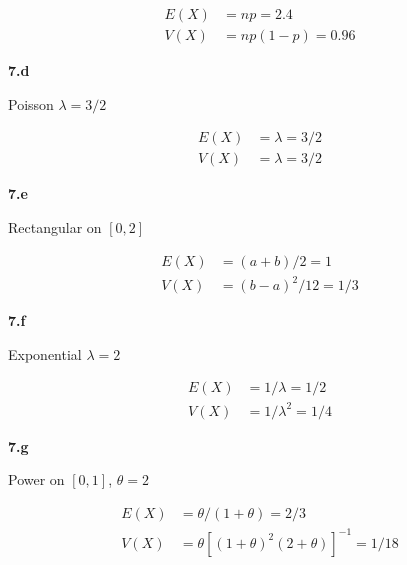 \documentclass{article}
\newcommand{\1}{\mathbf{1}}
\begin{document}
\begin{align*}
E(X) &= np = 2.4 \\
V(X) &= np(1-p) = 0.96
\end{align*}

\vspace{\baselineskip}
\noindent \textbf{\large 7.d}

Poisson $\lambda=3/2$

\begin{align*}
E(X) &= \lambda = 3/2 \\
V(X) &= \lambda = 3/2
\end{align*}

\vspace{\baselineskip}
\noindent \textbf{\large 7.e}

Rectangular on $[0,2]$

\begin{align*}
E(X) &= (a+b)/2 = 1 \\
V(X) &= (b-a)^2/12 = 1/3
\end{align*}

\vspace{\baselineskip}
\noindent \textbf{\large 7.f}

Exponential $\lambda=2$

\begin{align*}
E(X) &= 1/\lambda = 1/2 \\
V(X) &= 1/\lambda^2 = 1/4
\end{align*}

\vspace{\baselineskip}
\noindent \textbf{\large 7.g}

Power on $[0,1]$, $\theta=2$

\begin{align*}
E(X) &= \theta/(1+\theta) = 2/3 \\
V(X) &= \theta\left[ (1+\theta)^2(2+\theta)\right]^{-1} = 1/18
\end{align*}
\end{document}
